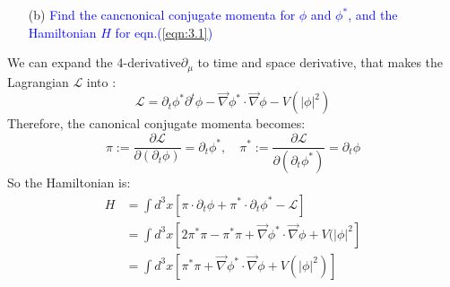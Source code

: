 \documentclass[11pt, a4paper]{article}
\begin{document}
\begin{enumerate}
    \item [(b)] \textcolor{blue}{
    Find the cancnonical conjugate momenta for $\phi$ and $\phi^*$, and the Hamiltonian $H$ for eqn.(\ref{eqn:3.1})
    }
\end{enumerate}
We can expand the 4-derivative$\partial_\mu$ to time and space derivative, that makes the Lagrangian $\mathcal{L}$ into :
\begin{equation}
    \mathcal{L} = \partial_t \phi^* \partial^t \phi - \vec{\nabla}\phi^* \cdot \vec{\nabla}\phi - V(|\phi|^2)
\end{equation}
Therefore, the canonical conjugate momenta becomes:
\begin{equation}
    \pi := \frac{\partial \mathcal{L}}{\partial (\partial_t \phi)} = \partial_t \phi^*, \quad \pi^* := \frac{\partial \mathcal{L}}{\partial (\partial_t \phi^*)} = \partial_t \phi
\end{equation}
So the Hamiltonian is:
\begin{align}
    H & = \int d^3 x \left[ \pi \cdot \partial_t\phi +\pi^* \cdot \partial_t\phi^* - \mathcal{L} \right] \\
    & = \int d^3 x \left[ 2 \pi^*\pi - \pi^*\pi + \vec{\nabla}\phi^* \cdot \vec{\nabla}\phi + V(|\phi|^2\right] \\
    & = \int d^3 x \left[ \pi^*\pi + \vec{\nabla}\phi^* \cdot \vec{\nabla}\phi + V(|\phi|^2) \right]
\end{align}

\newpage
\end{document}
